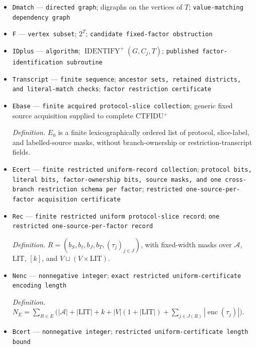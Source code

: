 \documentclass{article}
\begin{document}
\begin{itemize}
  \item \texttt{Dmatch} --- \texttt{directed graph}; digraphs on the vertices of \(T\); \texttt{value-\allowbreak{}matching dependency graph}
  \item \texttt{F} --- \texttt{vertex subset}; \(2^{T}\); \texttt{candidate fixed-\allowbreak{}factor obstruction}
  \item \texttt{IDplus} --- \texttt{algorithm}; \(\operatorname{IDENTIFY}^{+}(G,C_j,T)\); \texttt{published factor-\allowbreak{}identification subroutine}
  \item \texttt{Transcript} --- \texttt{finite sequence}; \texttt{ancestor sets,\allowbreak{} retained districts,\allowbreak{} and literal-\allowbreak{}match checks}; \texttt{factor restriction certificate}
  \item \texttt{Ebase} --- \texttt{finite acquired protocol-\allowbreak{}slice collection}; generic fixed source acquisition supplied to complete CTFIDU\({}^{+}\)
  \par\smallskip\noindent\emph{Definition.} \(E_0\) is a finite lexicographically ordered list of protocol, slice-label, and labelled-source masks, without branch-ownership or restriction-transcript fields.
  \item \texttt{Ecert} --- \texttt{finite restricted uniform-\allowbreak{}record collection}; \texttt{protocol bits,\allowbreak{} literal bits,\allowbreak{} factor-\allowbreak{}ownership bits,\allowbreak{} source masks,\allowbreak{} and one cross-\allowbreak{}branch restriction schema per factor}; \texttt{restricted one-\allowbreak{}source-\allowbreak{}per-\allowbreak{}factor acquisition certificate}
  \item \texttt{Rec} --- \texttt{finite restricted uniform protocol-\allowbreak{}slice record}; \texttt{one restricted one-\allowbreak{}source-\allowbreak{}per-\allowbreak{}factor record}
  \par\smallskip\noindent\emph{Definition.} \(R=(b_S,b_{\ell},b_J,b_T,(\tau_j)_{j\in J})\), with fixed-width masks over \(\mathcal A\), \(\mathrm{LIT}\), \([k]\), and \(V\sqcup(V\times\mathrm{LIT})\).
  \item \texttt{Nenc} --- \texttt{nonnegative integer}; \texttt{exact restricted uniform-\allowbreak{}certificate encoding length}
  \par\smallskip\noindent\emph{Definition.} \(N_E=\sum_{R\in E}\bigl(|\mathcal A|+|\mathrm{LIT}|+k+|V|(1+|\mathrm{LIT}|)+\sum_{j\in J(R)}|\operatorname{enc}(\tau_j)|\bigr)\).
  \item \texttt{Bcert} --- \texttt{nonnegative integer}; \texttt{restricted uniform-\allowbreak{}certificate length bound}

\end{itemize}
\end{document}
